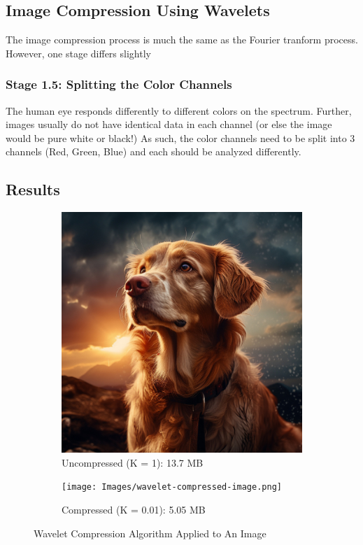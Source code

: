 \documentclass{article}
\begin{document}
\subsection*{Image Compression Using Wavelets}
The image compression process is much the same as the Fourier tranform process. However, one stage differs slightly
\subsubsection*{Stage 1.5: Splitting the Color Channels}
The human eye responds differently to different colors on the spectrum. Further, images usually do not have identical
data in each channel (or else the image would be pure white or black!) As such, the color channels need to be split
into 3 channels (Red, Green, Blue) and each should be analyzed differently.

\subsection*{Results}
\begin{figure}[h]
    \begin{subfigure}[b]{0.4\textwidth}
       \includegraphics[width=\textwidth]{Images/uncompressed-image.jpg}
       \caption{Uncompressed (K = 1): 13.7 MB}
       \label{fig:f3}
    \end{subfigure}
    \hfill
    \begin{subfigure}[b]{0.4\textwidth}
       \texttt{[image: Images/wavelet-compressed-image.png]}
       \caption{Compressed (K = 0.01): 5.05 MB}
       \label{fig:f4}
    \end{subfigure}
    \caption{Wavelet Compression Algorithm Applied to An Image }
   \end{figure}
\end{document}
